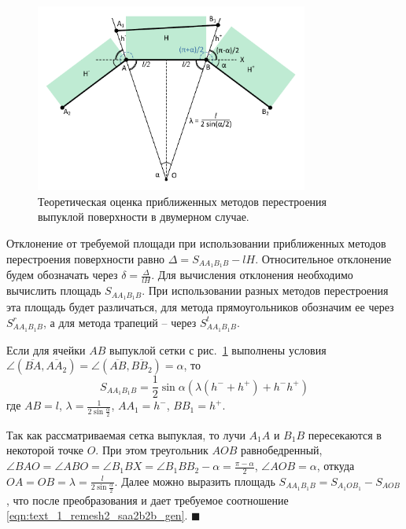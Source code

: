 \begin{figure}[ht]
\centering
\includegraphics[width=0.8\textwidth]{pics/text_1_remesh_2d/theoretical.pdf}
\singlespacing
{}\caption{Теоретическая оценка приближенных методов перестроения выпуклой поверхности в двумерном случае.}
\label{fig:text_1_remesh_2d_theoretical}
\end{figure}

Отклонение от требуемой площади при использовании приближенных методов перестроения поверхности равно $\Delta = S_{AA_1B_1B} - lH$.
Относительное отклонение будем обозначать через $\delta = \frac{\Delta}{lH}$.
Для вычисления отклонения необходимо вычислить площадь $S_{AA_1B_1B}$.
При использовании разных методов перестроения эта площадь будет различаться, для метода прямоугольников обозначим ее через $S_{AA_1B_1B}^r$, а для метода трапеций -- через $S_{AA_1B_1B}^t$.

\begin{lemma}\label{lem:text_1_remesh2_vypukl_lemma}
Если для ячейки $AB$ выпуклой сетки с рис.~\ref{fig:text_1_remesh_2d_theoretical} выполнены условия $\angle (\overline{BA}, \overline{AA_2}) = \angle (\overline{AB}, \overline{BB_2}) = \alpha$, то
\begin{equation}\label{eqn:text_1_remesh2_saa2b2b_gen}
S_{AA_1B_1B} = \frac{1}{2} \sin \alpha \left( \lambda(h^{-} + h^{+}) + h^{-}h^{+} \right)
\end{equation}
где $AB = l$, $\lambda = \frac{1}{2 \sin \frac{\alpha}{2}}$, $AA_1 = h^{-}$, $BB_1 = h^{+}$.
\end{lemma}

Так как рассматриваемая сетка выпуклая, то лучи $A_1A$ и $B_1B$ пересекаются в некоторой точке $O$.
При этом треугольник $AOB$ равнобедренный, $\angle BAO = \angle ABO = \angle B_1BX = \angle B_1BB_2 - \alpha = \frac{\pi - \alpha}{2}$, $\angle AOB = \alpha$, откуда $OA = OB = \lambda = \frac{l}{2 \sin \frac{\alpha}{2}}$.
Далее можно выразить площадь $S_{AA_1B_1B} = S_{A_1OB_1} - S_{AOB}$, что после преобразования и дает требуемое соотношение \eqref{eqn:text_1_remesh2_saa2b2b_gen}.
$\blacksquare$\\

